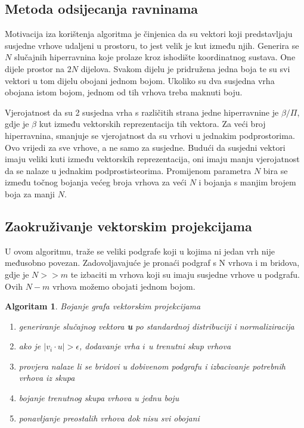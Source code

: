 \documentclass[diplomskirad]{fer}
\newtheorem{algoritam}{Algoritam}
\begin{document}
\subsection{Metoda odsijecanja ravninama}
Motivacija iza korištenja algoritma je činjenica da su vektori koji predstavljaju susjedne vrhove udaljeni u prostoru, to jest velik je kut između njih.
Generira se $N$ slučajnih hiperravnina koje prolaze kroz ishodište koordinatnog sustava. One dijele prostor na $2N$ dijelova. Svakom dijelu je pridružena
jedna boja te su svi vektori u tom dijelu obojani jednom bojom. Ukoliko su dva susjedna vrha obojana istom bojom, jednom od tih vrhova treba maknuti boju.

Vjerojatnost da su 2 susjedna vrha s različitih strana jedne hiperravnine je $\beta / \Pi$, gdje je $\beta$ kut između vektorskih reprezentacija
tih vektora. Za veći broj hiperravnina, smanjuje se vjerojatnost da su vrhovi u jednakim podprostorima. Ovo vrijedi za sve vrhove, a ne samo za susjedne.
Budući da susjedni vektori imaju veliki kuti između vektorskih reprezentacija, oni imaju manju vjerojatnost da se nalaze u jednakim podprostisteorima.
Promijenom parametra $N$ bira se između točnog bojanja većeg broja vrhova za veći $N$ i bojanja s manjim brojem boja za manji $N$. \cite{karger1998approximategraphcoloringsemidefinite} 


\subsection{Zaokruživanje vektorskim projekcijama}
\label{pog_vektorske_projekcije}
U ovom algoritmu, traže se veliki podgrafe koji u kojima ni jedan vrh nije međusobno povezan. Zadovoljavajuće je pronaći podgraf s N vrhova i m bridova,
gdje je $N >> m$ te izbaciti m vrhova koji su imaju susjedne vrhove u podgrafu. Ovih $N - m$ vrhova možemo obojati jednom bojom.

\begin{algoritam} Bojanje grafa vektorskim projekcijama
  \begin{enumerate}
    \item generiranje slučajnog vektora \textbf{u} po standardnoj distribuciji i normaliziracija
    \item ako je $|v_i \cdot u| > \epsilon$, dodavanje vrha $i$ u trenutni skup vrhova 
    \item provjera nalaze li se bridovi u dobivenom podgrafu i izbacivanje potrebnih vrhova iz skupa
    \item bojanje trenutnog skupa vrhova u jednu boju
    \item ponavljanje preostalih vrhova dok nisu svi obojani
  \end{enumerate}
\end{algoritam}
\end{document}
